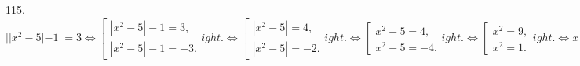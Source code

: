115. $||x^2-5|-1|=3\Leftrightarrow \left[\begin{array}{l}|x^2-5|-1=3,\\ |x^2-5|-1=-3.\end{array}
ight. \Leftrightarrow \left[\begin{array}{l}|x^2-5|=4,\\ |x^2-5|=-2.\end{array}
ight.\Leftrightarrow \left[\begin{array}{l}x^2-5=4,\\ x^2-5=-4.\end{array}
ight.\Leftrightarrow \left[\begin{array}{l}x^2=9,\\ x^2=1.\end{array}
ight.\Leftrightarrow x\in\{\pm1;\pm3\}.$\\
